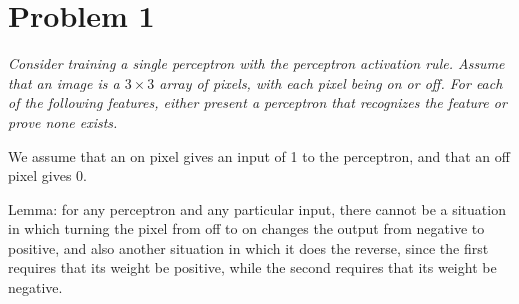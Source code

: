\documentclass{article}
\begin{document}
  \section*{Problem 1}
  \textit{Consider training a single perceptron with the perceptron
    activation rule.  Assume that an image is a $3\times 3$ array of
    pixels, with each pixel being on or off. For each of the following
    features, either present a perceptron that recognizes the feature
    or prove none exists.}

  We assume that an on pixel gives an input of 1 to the perceptron,
  and that an off pixel gives 0.

  Lemma: for any perceptron and any particular input, there cannot be
  a situation in which turning the pixel from off to on changes the
  output from negative to positive, and also another situation in
  which it does the reverse, since the first requires that its weight
  be positive, while the second requires that its weight be negative.
\end{document}

